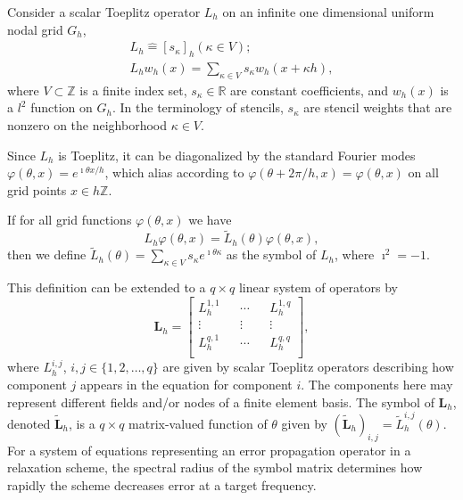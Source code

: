\documentclass[review]{siamart190516}
\begin{document}
Consider a scalar Toeplitz operator $L_h$ on an infinite one dimensional uniform nodal grid $G_h$,
\begin{equation}
\begin{split}
L_h \mathrel{\hat{=}} \left[ s_\kappa \right]_h \left( \kappa \in V \right);\\
L_h w_h \left( x \right) = \sum_{\kappa \in V} s_\kappa w_h \left( x + \kappa h \right),
\end{split}
\end{equation}
where $V \subset \mathbb{Z}$ is a finite index set, $s_\kappa \in \mathbb{R}$ are constant coefficients, and $w_h \left( x \right)$ is a $l^2$ function on $G_h$. In the terminology of stencils, $s_{\kappa}$ are stencil weights that are nonzero on the neighborhood $\kappa \in V$.

Since $L_h$ is Toeplitz, it can be diagonalized by the standard Fourier modes $\varphi \left( \theta, x \right) = e^{\imath \theta x / h}$, which alias according to $\varphi(\theta+ 2\pi/h, x) = \varphi(\theta, x)$ on all grid points $x \in h \mathbb Z$.

\begin{definition}[Symbol of $L_h$]\label{def:symbol}
If for all grid functions $\varphi \left( \theta, x \right)$ we have
\begin{equation}
L_h \varphi \left( \theta, x \right) = \tilde{L}_h \left( \theta \right) \varphi \left( \theta, x \right),
\end{equation}
then we define $\tilde{L}_h \left( \theta \right) = \sum_{\kappa \in V} s_\kappa e^{\imath \theta \kappa}$ as the symbol of $L_h$, where $\imath^2 = -1$.
\end{definition}

This definition can be extended to a $q \times q$ linear system of operators by
\begin{equation}
\mathbf{L}_h =
\begin{bmatrix}
    L_h^{1, 1} && \cdots && L_h^{1, q}        \\
    \vdots               && \vdots && \vdots  \\
    L_h^{q, 1} && \cdots && L_h^{q, q}        \\
\end{bmatrix},
\end{equation}
where $L_h^{i, j}$, $i, j \in \lbrace 1, 2, \dots, q \rbrace$ are given by scalar Toeplitz operators describing how component $j$ appears in the equation for component $i$.
The components here may represent different fields and/or nodes of a finite element basis.
The symbol of $\mathbf{L}_h$, denoted $\tilde{\mathbf{L}}_h$, is a $q \times q$ matrix-valued function of $\theta$ given by $\left( \tilde{\mathbf{L}}_h \right)_{i, j} = \tilde{L}_h^{i, j} \left( \theta \right)$.
For a system of equations representing an error propagation operator in a relaxation scheme, the spectral radius of the symbol matrix determines how rapidly the scheme decreases error at a target frequency.
\end{document}
